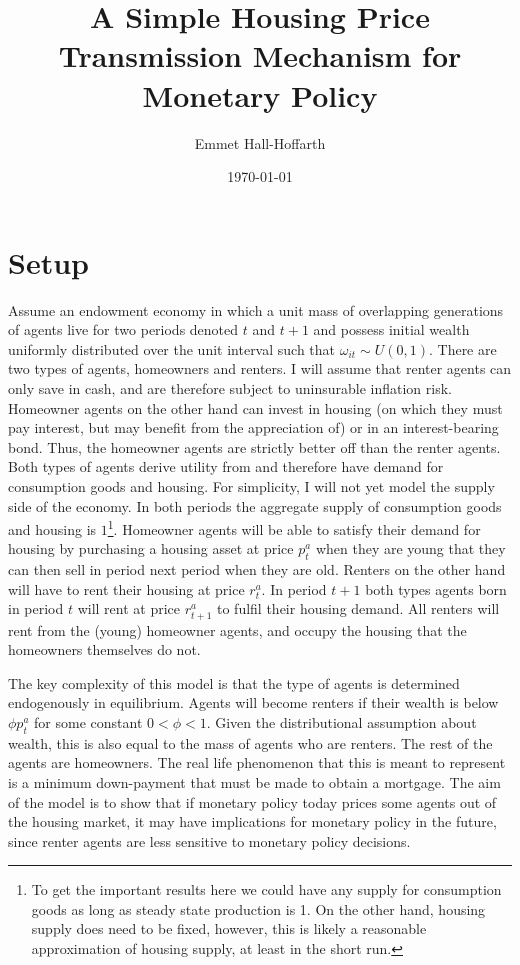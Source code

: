 \documentclass{article}
\title{A Simple Housing Price Transmission Mechanism for Monetary Policy}
\author{Emmet Hall-Hoffarth}
\date{\today}
\begin{document}
\maketitle
    
\section{Setup}

Assume an endowment economy in which a unit mass of overlapping generations of agents live for two periods denoted $t$ and $t+1$ and possess initial wealth uniformly distributed over the unit interval such that $\omega_{it} \sim U(0,1)$. There are two types of agents, homeowners and renters. I will assume that renter agents can only save in cash, and are therefore subject to uninsurable inflation risk. Homeowner agents on the other hand can invest in housing (on which they must pay interest, but may benefit from the appreciation of) or in an interest-bearing bond. Thus, the homeowner agents are strictly better off than the renter agents. Both types of agents derive utility from and therefore have demand for consumption goods and housing. For simplicity, I will not yet model the supply side of the economy. In both periods the aggregate supply of consumption goods and housing is $1$\footnote{To get the important results here we could have any supply for consumption goods as long as steady state production is 1. On the other hand, housing supply does need to be fixed, however, this is likely a reasonable approximation of housing supply, at least in the short run.}. Homeowner agents will be able to satisfy their demand for housing by purchasing a housing asset at price $p^a_t$ when they are young that they can then sell in period next period when they are old. Renters on the other hand will have to rent their housing at price $r^a_t$. In period $t+1$ both types agents born in period $t$ will rent at price $r^a_{t+1}$ to fulfil their housing demand. All renters will rent from the (young) homeowner agents, and occupy the housing that the homeowners themselves do not.

The key complexity of this model is that the type of agents is determined endogenously in equilibrium. Agents will become renters if their wealth is below $\phi p^a_t$ for some constant $0 < \phi < 1$. Given the distributional assumption about wealth, this is also equal to the mass of agents who are renters. The rest of the agents are homeowners. The real life phenomenon that this is meant to represent is a minimum down-payment that must be made to obtain a mortgage. The aim of the model is to show that if monetary policy today prices some agents out of the housing market, it may have implications for monetary policy in the future, since renter agents are less sensitive to monetary policy decisions.
\end{document}
